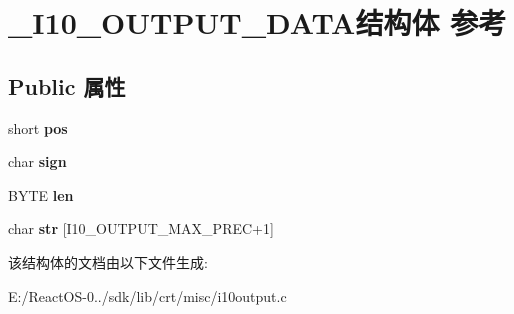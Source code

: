 \hypertarget{struct___i10___o_u_t_p_u_t___d_a_t_a}{}\section{\+\_\+\+I10\+\_\+\+O\+U\+T\+P\+U\+T\+\_\+\+D\+A\+T\+A结构体 参考}
\label{struct___i10___o_u_t_p_u_t___d_a_t_a}
\subsection*{Public 属性}
\begin{DoxyCompactItemize}
\item 
\mbox{\label{struct___i10___o_u_t_p_u_t___d_a_t_a_ab47ac3b0ece2544665023765af795563}} 
short {\bfseries pos}
\item 
\mbox{\label{struct___i10___o_u_t_p_u_t___d_a_t_a_acdeda28ded09a0271806f09aefcd10db}} 
char {\bfseries sign}
\item 
\mbox{\label{struct___i10___o_u_t_p_u_t___d_a_t_a_af24b83cbcd8054691c37d70049f39aa1}} 
B\+Y\+TE {\bfseries len}
\item 
\mbox{\label{struct___i10___o_u_t_p_u_t___d_a_t_a_abb71066559618015f08ed8a7a94a91ef}} 
char {\bfseries str} \mbox{[}I10\+\_\+\+O\+U\+T\+P\+U\+T\+\_\+\+M\+A\+X\+\_\+\+P\+R\+EC+1\mbox{]}
\end{DoxyCompactItemize}


该结构体的文档由以下文件生成\+:\begin{DoxyCompactItemize}
\item 
E\+:/\+React\+O\+S-\/0../sdk/lib/crt/misc/i10output.\+c\end{DoxyCompactItemize}
